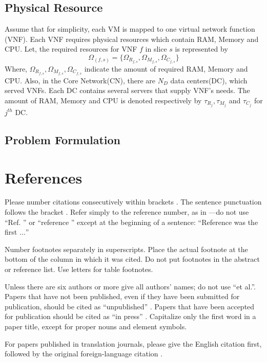 \documentclass[conference]{IEEEtran}
\begin{document}
\subsection{Physical Resource}
Assume that for simplicity, each VM is mapped to one virtual network function (VNF). Each VNF requires
physical resources which contain RAM, Memory and CPU.
Let, the required resources for VNF $f$ in slice $s$ is represented by
\begin{equation}
\Omega_{(f,s)} = \{\Omega_{R_{f,s}}, \Omega_{M_{f,s}}, \Omega_{C_{f,s}} \}
\end{equation} 
Where, $\Omega_{R_{f,s}}, \Omega_{M_{f,s}}, \Omega_{C_{f,s}}$ indicate the amount of required RAM, Memory and CPU.
Also, in the Core Network(CN), there are $N_{D}$ data centers(DC), which served VNFs. Each DC contains several servers that supply VNF's needs.
The amount of RAM, Memory and CPU is denoted respectively by $\tau_{R_{j}}, \tau_{M_{j}}$ and $\tau_{C_{j}} $ for $j^{th}$ DC.
\subsection{Problem Formulation}

\section*{References}

Please number citations consecutively within brackets \cite{b1}. The 
sentence punctuation follows the bracket \cite{b2}. Refer simply to the reference 
number, as in \cite{b3}---do not use ``Ref. \cite{b3}'' or ``reference \cite{b3}'' except at 
the beginning of a sentence: ``Reference \cite{b3} was the first $\ldots$''

Number footnotes separately in superscripts. Place the actual footnote at 
the bottom of the column in which it was cited. Do not put footnotes in the 
abstract or reference list. Use letters for table footnotes.

Unless there are six authors or more give all authors' names; do not use 
``et al.''. Papers that have not been published, even if they have been 
submitted for publication, should be cited as ``unpublished'' \cite{b4}. Papers 
that have been accepted for publication should be cited as ``in press'' \cite{b5}. 
Capitalize only the first word in a paper title, except for proper nouns and 
element symbols.

For papers published in translation journals, please give the English 
citation first, followed by the original foreign-language citation \cite{b6}.
\end{document}
